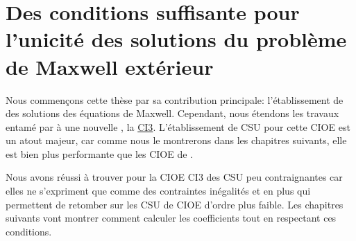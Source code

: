 \chapter[Des CSU des solutions du problème de Maxwell extérieur]{Des conditions suffisante pour l'unicité des solutions du problème de Maxwell extérieur}
\label{sec:csu}
\minitoc
\newpage
{}
Nous commençons cette thèse par sa contribution principale: l'établissement de  des solutions des équations de Maxwell. Cependant, nous étendons les travaux entamé par \cite{stupfel_sufficient_2011} à une nouvelle , la \hyperlink{ci3}{CI3}. L'établissement de CSU pour cette CIOE est un atout majeur, car comme nous le montrerons dans les chapitres suivants, elle est bien plus performante que les CIOE de \cite{stupfel_sufficient_2011}.



Nous avons réussi à trouver pour la CIOE CI3 des CSU peu contraignantes car elles ne s'expriment que comme des contraintes inégalités et en plus qui permettent de retomber sur les CSU de CIOE d'ordre plus faible. Les chapitres suivants vont montrer comment calculer les coefficients tout en respectant ces conditions.